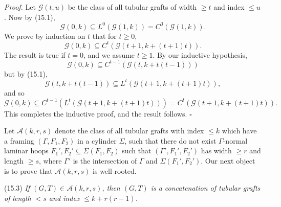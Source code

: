 \textit{Proof.} Let $\mathcal{G}(t, u)$ be the class of all tubular grafts of width $\ge t$ and index $\le u$. Now by (15.1),
\begin{equation*}
\mathcal{G}(0, k) \subseteq L^0(\mathcal{G}(1, k)) = C^0(\mathcal{G}(1, k)).
\end{equation*}
We prove by induction on $t$ that for $t \ge 0$,
\begin{equation*}
\mathcal{G}(0, k) \subseteq C^t(\mathcal{G}(t + 1, k + (t + 1)t)).
\end{equation*}
The result is true if $t = 0$, and we assume $t \ge 1$. By our inductive hypothesis,
\begin{equation*}
\mathcal{G}(0, k) \subseteq C^{t-1}(\mathcal{G}(t, k + t(t - 1)))
\end{equation*}
but by (15.1),
\begin{equation*}
\mathcal{G}(t, k + t(t - 1)) \subseteq L^t(\mathcal{G}(t + 1, k + (t + 1)t)),
\end{equation*}
and so
\begin{equation*}
\mathcal{G}(0, k) \subseteq C^{t-1}(L^t(\mathcal{G}(t + 1, k + (t + 1)t))) = C^t(\mathcal{G}(t + 1, k + (t + 1)t)).
\end{equation*}
This completes the inductive proof, and the result follows. $\square$

Let $\mathcal{A}(k, r, s)$ denote the class of all tubular grafts with index $\le k$ which have a framing $(\Gamma, F_1, F_2)$ in a cylinder $\Sigma$, such that there do not exist $\Gamma$-normal laminar hoops $F_1', F_2' \subseteq \Sigma(F_1, F_2)$ such that $(\Gamma', F_1', F_2')$ has width $\ge r$ and length $\ge s$, where $\Gamma'$ is the intersection of $\Gamma$ and $\Sigma(F_1', F_2')$. Our next object is to prove that $\mathcal{A}(k, r, s)$ is well-rooted.

\stmt
(15.3) \textit{If $(G, T) \in \mathcal{A}(k, r, s)$, then $(G, T)$ is a concatenation of tubular grafts of length $< s$ and index $\le k + r(r - 1)$.}
